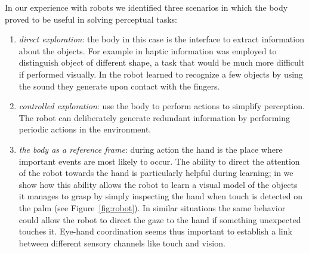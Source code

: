 In our experience with robots we identified three scenarios in which
the body proved to be useful in solving perceptual tasks:

\begin{enumerate}

\item {\em direct exploration}: the body in this case is the interface to
   extract information about the objects. For example in
   \cite{natale04learning} haptic information was employed to
   distinguish object of different shape, a task that would be much
   more difficult if performed visually. In
   \cite{torres-jara05tapping} the robot learned to recognize a few
   objects by using the sound they generate upon contact with the
   fingers.

\item {\em controlled exploration}: use the body to perform actions to simplify
   perception. The robot can deliberately generate redundant
   information by performing periodic actions in the environment.

\item {\em the body as a reference frame}: during action the hand is the place
   where important events are most likely to occur. The ability to
   direct the attention of the robot towards the hand is particularly
   helpful during learning; in \cite{natale05exploring} we show how
   this ability allows the robot to learn a visual model of the
   objects it manages to grasp by simply inspecting the hand when
   touch is detected on the palm (see Figure~\ref{fig:robot}). In
   similar situations the same behavior could allow the robot to
   direct the gaze to the hand if something unexpected touches
   it. Eye-hand coordination seems thus important to establish a link
   between different sensory channels like touch and vision.

\end{enumerate}




